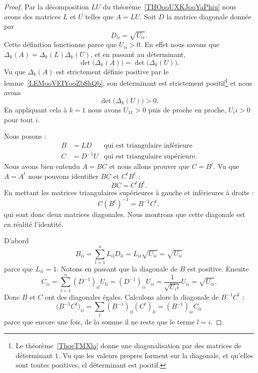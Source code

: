 \begin{proof}
	Par la décomposition \( LU\) du théorème~\ref{THOooUXKJooYaPhiu} nous avons des matrices \( L\) et \( U\) telles que \( A=LU\). Soit \( D\) la matrice diagonale donnée par
	\begin{equation}
		D_{ii}=\sqrt{ U_{ii} }.
	\end{equation}
	Cette définition fonctionne parce que \( U_{ii}>0\). En effet nous savons que \( \Delta_k(A)=\Delta_k(L)\Delta_k(U)\), et en passant au déterminant,
	\begin{equation}
		\det\big( \Delta_k(A) \big)=\det\big( \Delta_k(U) \big).
	\end{equation}
	Vu que \( \Delta_k(A)\) est strictement définie positive par le lemme~\ref{LEMooVEIYooZbShQb}, son determinant est strictement positif\footnote{Le théorème~\ref{ThoeTMXla} donne une diagonalisation par des matrices de déterminant \( 1\). Vu que les valeurs propres forment sur la diagonale, et qu'elles sont toutes positives, el déterminant est positif.} et nous avons
	\begin{equation}
		\det\big( \Delta_k(U) \big)>0.
	\end{equation}
	En appliquant cela à \( k=1\) nous avons \( U_{11}>0\) puis de proche en proche, \( U_ii>0\) pour tout \( i\).

	Nous posons :
	\begin{subequations}
		\begin{align}
			B & =LD       & \text{qui est triangulaire inférieure}  \\
			C & =D^{-1} U & \text{qui est triangulaire supérieure.}
		\end{align}
	\end{subequations}
	Nous avons bien entendu \( A=BC\) et nous allons prouver que \( C=B^t\). Vu que \( A=A^t\) nous pouvons identifier \( BC\) et \( C^tB^t\) :
	\begin{equation}
		BC=C^tB^t.
	\end{equation}
	En mettant les matrices triangulaires supérieures à gauche et inférieures à droite :
	\begin{equation}
		C(B^t)^{-1}=B^{-1}C^t,
	\end{equation}
	qui sont donc deux matrices diagonales. Nous montrons que cette diagonale est en réalité l'identité.

	D'abord
	\begin{equation}
		B_{ii}=\sum_{l=1}^nL_{il}D_{li}=L_{ii}\sqrt{ U_{ii} }=\sqrt{ U_{ii} }
	\end{equation}
	parce que \( L_{ii}=1\). Notons en passant que la diagonale de \( B\) est positive.  Ensuite
	\begin{equation}
		C_{ii}=\sum_{l=1}^n(D^{-1})_{il}U_{li}=(D^{-1})_{ii}U_{ii}=\frac{1}{ \sqrt{ U_ii } }U_{ii}=\sqrt{ U_{ii} }.
	\end{equation}
	Donc \( B\) et \( C\) ont des diagonales égales. Calculons alors la diagonale de \( B^{-1}C^t\) :
	\begin{equation}
		\big( B^{-1}C^t \big)_{ii}=\sum_l(B^{-1})_{il}(C^t)_{li}=(B^{-1})_{ii}C_{ii}
	\end{equation}
	parce que encore une fois, de la somme il ne reste que le terme \( l=i\).


\end{proof}
